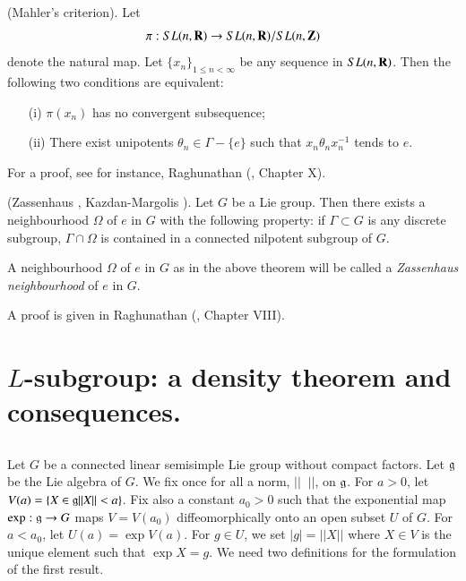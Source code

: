 \begin{romancorollary}{\rm (Mahler's criterion).}\label{art9-romancoro7}
Let 
$$
\pi : S L (n, \mathbf{R}) \to SL (n, \mathbf{R}) / SL (n, \mathbf{Z})
$$
denote the natural map. Let $\{x_n\}_{1 \leq n < \infty}$ be any sequence in $SL (n, \mathbf{R})$. Then the following two conditions are equivalent:
\begin{itemize}
\item[(i)] $\pi (x_n)$ has no convergent subsequence;

\item[(ii)] There exist unipotents $\theta_n \in\Gamma - \{e\}$ such that $x_n \theta_n x^{-1}_n$ tends to $e$.
\end{itemize}
\end{romancorollary}

For a proof, see for instance, Raghunathan (\cite{art9-key1}, Chapter X).

\begin{romantheorem}{\rm (Zassenhaus \cite{art9-key1}, Kazdan-Margolis \cite{art9-key1}).}\label{art9-romanthm9}
Let $G$ be a Lie group. Then there exists a neighbourhood $\Omega$ of $e$ in $G$ with the following property: if $\Gamma \subset G$ is any discrete subgroup, $\Gamma \cap \Omega$ is contained in a connected nilpotent subgroup of $G$.
\end{romantheorem}

A neighbourhood $\Omega$ of $e$ in $G$ as in the above theorem will be called a \textit{Zassenhaus neighbourhood} of $e$ in $G$.

A proof is given in Raghunathan (\cite{art9-key1}, Chapter VIII).

\section{$L$-subgroup: a density theorem and consequences.}\pageoriginale\label{art9-sec1}

\subsection{}\label{art9-subsec1.1}
Let $G$ be a connected linear semisimple Lie group without compact factors. Let $\mathfrak{g}$ be the Lie algebra of $G$. We fix once for all a norm, $||\;\; ||$, on $\mathfrak{g}$. For $a>0$, let $V(a) = \{X \in \mathfrak{g} ||X|| < a \}$. Fix also a constant $a_0>0$ such that the exponential map $\exp : \mathfrak{g} \to G$ maps $V = V(a_0)$ diffeomorphically onto an open subset $U$ of $G$. For $a< a_0$, let $U (a) = \exp V(a)$. For $g \in U$, we set $|g| = ||X||$ where $X \in V$ is the unique element such that $\exp  X = g$. We need two definitions for the formulation of the first result.

